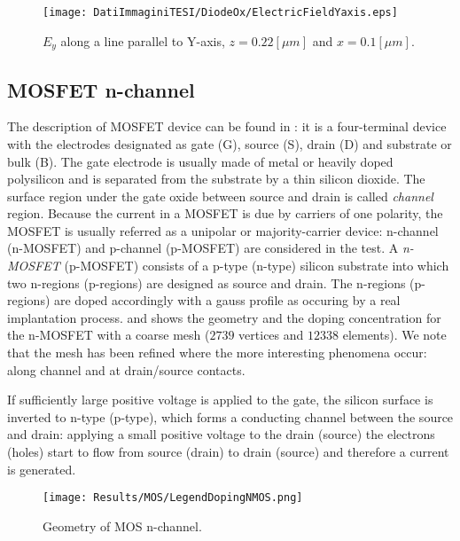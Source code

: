 \begin{figure}[!h]
\centering
\texttt{[image: DatiImmaginiTESI/DiodeOx/ElectricFieldYaxis.eps]}
\caption{$E_y$ along a line parallel to Y-axis, $z=0.22[\mu m]$ and $x=0.1[\mu m]$.}
\label{fig: salto electric field}
\end{figure}


\clearpage





\subsection{MOSFET n-channel}
\label{sec: MOS}


The description of MOSFET device can be found in \cite{ModernVLSIdevices}: it is a four-terminal device with the electrodes designated as gate (G), source (S), drain (D) and substrate or bulk (B). The gate electrode is usually made of metal or heavily doped polysilicon and is separated from the substrate by a thin silicon dioxide. The surface region under the gate oxide between source and drain is called \textit{channel} region.
Because the current in a MOSFET is due by carriers of one polarity, the MOSFET is usually referred as a unipolar or majority-carrier device: n-channel (n-MOSFET) and p-channel (p-MOSFET) are considered in the test. A \textit{n-MOSFET} (p-MOSFET) consists of a p-type (n-type) silicon substrate into which two n-regions (p-regions) are designed as source and drain. The n-regions (p-regions) are doped accordingly with a gauss profile as occuring by a real implantation process. 
 and  shows the geometry and the doping concentration for the n-MOSFET with a coarse mesh ($2739$ vertices and $12338$ elements). 
We note that the mesh has been refined where the more interesting phenomena occur: along channel and at drain/source contacts.

If sufficiently large positive voltage is applied to the gate, the silicon surface is inverted to n-type (p-type), which forms a conducting channel between the source and drain: applying a small positive voltage to the drain (source) the electrons (holes) start to flow from source (drain) to drain (source) and therefore a current is generated. 

\begin{figure}[!b]
\centering
{}
\hspace{0.06\textwidth}
{\texttt{[image: Results/MOS/LegendDopingNMOS.png]}}
\caption{Geometry of MOS n-channel.}
\label{fig: mos geometry}
\end{figure}




